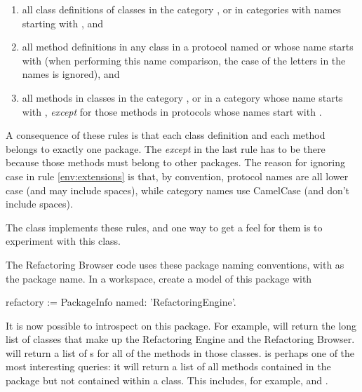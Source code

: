 \documentclass[a4paper,10pt,twoside]{book}
\begin{document}
\begin{enumerate}		\label{sec:packageRules}
	\item{} all class definitions of classes in the category , or in categories with names starting with , and
	\item{} \label{env:extensions} all method definitions in any class in a protocol named  or whose name starts with  (when performing this name comparison, the case of the letters in the names is ignored), and
	\item{} all methods in classes in the category , or in a category whose name starts with , \emph{except} for those methods in protocols whose names start with \prot{*}.
	
\end{enumerate}
\noindent
A consequence of these rules is that each class definition and each method belongs to exactly one package. The \emph{except} in the last rule has to be there because those methods must belong to other packages.   The reason for ignoring case in rule \ref{env:extensions} is that, by convention, protocol names are all lower case (and may include spaces), while category names use CamelCase (and don't include spaces).

The class  implements these rules, and one way to get a feel for them is to experiment with this class.

The Refactoring Browser code uses these package naming conventions, with  as the package name. In a workspace, create a model of this package with

\begin{code}{}
refactory := PackageInfo named: 'RefactoringEngine'. 
\end{code}

It is now possible to introspect on this package. 
For example,  will return the long list of classes that make up the Refactoring Engine and the Refactoring Browser.  
will return a list of s for all of the methods in those classes.  is perhaps one of the most interesting queries: it will return a list of all methods contained in the  package but not contained within a  class. This includes, for example,  and .
\end{document}
